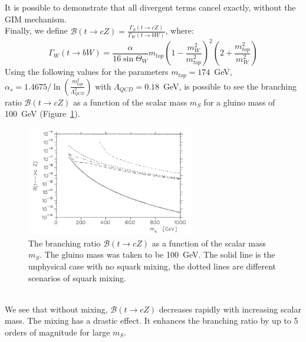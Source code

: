 It is possible to demonstrate that all divergent terms cancel exactly, without the GIM mechanism.\\
Finally, we define $\mathcal{B}(t \rightarrow cZ)=\frac{\Gamma_{S}(t \rightarrow cZ)}{\Gamma_{W}(t \rightarrow bW)}$, where:
\begin{equation} 
\Gamma_{W}(t \rightarrow bW) = \frac{\alpha}{16\sin{\Theta_W}} m_{top} \left(1-\frac{m^{2}_{W}}{m^{2}_{top}}\right)^2 \left(2+\frac{m^{2}_{top}}{m^{2}_{W}}\right)
\end{equation}
Using the following values for the parameters $m_{top}=174$~GeV, $\alpha_{s}=1.4675/\ln{\left( \frac{m^{2}_{top}}{\Lambda^{2}_{QCD}} \right)}$ with $\Lambda_{QCD}=0.18$~GeV, is
possible to see the branching ratio $\mathcal{B}(t \rightarrow cZ)$ as a function of the scalar mass $m_{S}$ for a gluino mass of 100~GeV (Figure~\ref{fig:BR_mssm}).
\begin{figure}[!h]
	\centering
	\includegraphics[width=0.65\textwidth]{Chapters/CH1/figures/BR_mssm}
	\caption{The branching ratio $\mathcal{B}(t \rightarrow cZ)$ as a function of the scalar mass $m_{S}$. The gluino mass was taken to be 100~GeV. The solid line is the unphysical case 
		with no squark mixing, the dotted lines are different scenarios of squark mixing\cite{coulture_mssm}.}
	\label{fig:BR_mssm}
\end{figure}
\\We see that without mixing, $\mathcal{B}(t \rightarrow cZ)$ decreases rapidly with increasing scalar mass. The mixing has a drastic effect. It enhances the branching ratio by up to 
5 orders of magnitude for large $m_{S}$.
\clearpage
\let\cleardoublepage\clearpage

